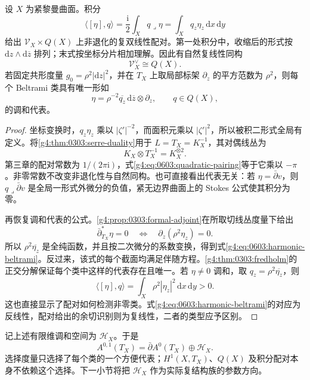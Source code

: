 \begin{theorem}\label{g4:thm:0603:serre-duality}
	设 \(X\) 为紧黎曼曲面。积分
	\begin{equation}\label{g4:eq:0603:quadratic-pairing}
		\langle[\eta],q\rangle
		=\frac{\mathrm{i}}2\int_X q\mathbin{\lrcorner}\eta
		=\int_Xq_z\eta_z\,\mathrm{d}x\,\mathrm{d}y
	\end{equation}
	给出 \(\mathcal V_X\times Q(X)\) 上非退化的复双线性配对。第一处积分中，收缩后的形式按 \(\mathrm{d}z\wedge\mathrm{d}\overline z\) 排列；末式按坐标分片相加理解。因此有自然复线性同构
	\[
		\mathcal V_X^\vee\cong Q(X).
	\]
	若固定共形度量 \(g_0=\rho^2|\mathrm{d}z|^2\)，并在 \(T_X\) 上取局部标架 \(\partial_z\) 的平方范数为 \(\rho^2\)，则每个 Beltrami 类具有唯一形如
	\begin{equation}\label{g4:eq:0603:harmonic-beltrami}
		\eta=\rho^{-2}\overline{q_z}\,
		\mathrm{d}\overline z\otimes\partial_z,
		\qquad q\in Q(X),
	\end{equation}
	的调和代表。
\end{theorem}
\begin{proof}
	坐标变换时，\(q_z\eta_z\) 乘以 \(|\zeta'|^{-2}\)，而面积元乘以 \(|\zeta'|^2\)，所以被积二形式全局有定义。将\cref{g4:thm:0303:serre-duality}用于 \(L=T_X=K_X^{-1}\)，其对偶线丛为
	\[
		K_X\otimes T_X^{-1}=K_X^{\otimes2}.
	\]
	第三章的配对常数为 \(1/(2\pi\mathrm{i})\)，式\eqref{g4:eq:0603:quadratic-pairing}等于它乘以 \(-\pi\)。非零常数不改变非退化性与自然同构。也可直接看出代表无关：若 \(\eta=\bar\partial v\)，则 \(q\mathbin{\lrcorner}\bar\partial v\) 是全局一形式外微分的负值，紧无边界曲面上的 Stokes 公式使其积分为零。

	再恢复调和代表的公式。\cref{g4:prop:0303:formal-adjoint}在所取切线丛度量下给出
	\[
		\bar\partial_{T_X}^*\eta=0
		\quad\Longleftrightarrow\quad
		\partial_z(\rho^2\eta_z)=0.
	\]
	所以 \(\rho^2\overline{\eta_z}\) 是全纯函数，并且按二次微分的系数变换，得到式\eqref{g4:eq:0603:harmonic-beltrami}。反过来，该式的每个截面均满足伴随方程。\cref{g4:thm:0303:fredholm}的正交分解保证每个类中这样的代表存在且唯一。若 \(\eta\ne0\) 调和，取 \(q_z=\rho^2\overline{\eta_z}\)，则
	\[
		\langle[\eta],q\rangle
		=\int_X\rho^2|\eta_z|^2\,\mathrm{d}x\,\mathrm{d}y>0.
	\]
	这也直接显示了配对如何检测非零类。式\eqref{g4:eq:0603:harmonic-beltrami}的对应为反线性，配对给出的余切识别则为复线性，二者的类型应予区别。
\end{proof}

记上述有限维调和空间为 \(\mathscr H_X\)。于是
\begin{equation}\label{g4:eq:0603:hodge-splitting}
	A^{0,1}(T_X)=\bar\partial A^0(T_X)\oplus\mathscr H_X.
\end{equation}
选择度量只选择了每个类的一个方便代表；\(H^1(X,T_X)\)、\(Q(X)\) 及积分配对本身不依赖这个选择。下一小节将把 \(\mathscr H_X\) 作为实际复结构族的参数方向。

